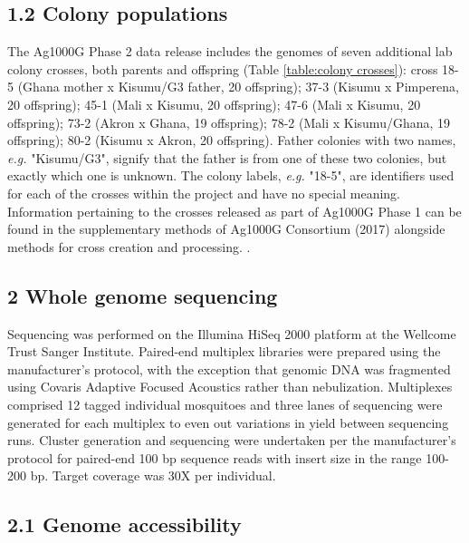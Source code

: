 \documentclass[a4paper,11pt,abstracton,hidelinks]{scrartcl}
\begin{document}
\subsection*{1.2 Colony populations}

The Ag1000G Phase 2 data release includes the genomes of seven additional lab colony crosses, both parents and offspring (Table \ref{table:colony crosses}):
%
cross 18-5 (Ghana mother x Kisumu/G3 father, 20 offspring); 37-3 (Kisumu x Pimperena, 20 offspring); 45-1 (Mali x Kisumu, 20 offspring); 47-6 (Mali x Kisumu, 20 offspring); 73-2 (Akron x Ghana, 19 offspring); 78-2 (Mali x Kisumu/Ghana, 19 offspring); 80-2 (Kisumu x Akron, 20 offspring).
%
Father colonies with two names, \textit{e.g.} "Kisumu/G3", signify that the father is from one of these two colonies, but exactly which one is unknown.
%
The	colony labels, \textit{e.g.}	"18-5", are	identifiers used for	
each of the crosses	within the project and	have no special meaning.	
%
Information pertaining to the crosses released as part of Ag1000G Phase 1 can be found in the supplementary methods of Ag1000G Consortium (2017) alongside methods for cross creation and processing. \cite{Ag1000gConsortium2017}.

\subsection*{2 Whole genome sequencing}

%
Sequencing was performed on the Illumina HiSeq 2000 platform at the Wellcome Trust Sanger Institute.
%
Paired-end multiplex libraries were prepared using the manufacturer's protocol, with the exception that genomic DNA was fragmented using Covaris Adaptive Focused Acoustics rather than nebulization.
%
Multiplexes comprised 12 tagged individual mosquitoes and three lanes of sequencing were generated for each multiplex to even out variations in yield between sequencing runs.
%
Cluster generation and sequencing were undertaken per the manufacturer's protocol for paired-end 100 bp sequence reads with insert size in the range 100-200 bp.
%
Target coverage was 30X per individual.


\subsection*{2.1 Genome accessibility}
\end{document}
